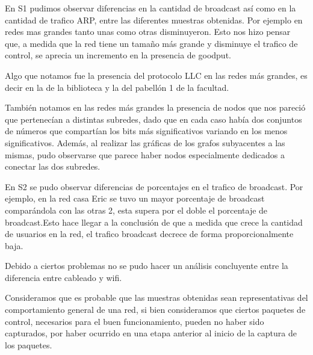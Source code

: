 	En S1 pudimos observar diferencias en la cantidad de broadcast así
    como en la cantidad de trafico ARP, entre las diferentes muestras
    obtenidas. Por ejemplo en redes mas grandes tanto unas como otras
    disminuyeron. Esto nos hizo pensar que, a medida que la red tiene
    un tamaño más grande y disminuye el trafico de control, se aprecia
    un incremento en la presencia de goodput.

    
    Algo que notamos fue la presencia del protocolo LLC en las redes
    más grandes, es decir en la de la biblioteca y la del pabellón 1
    de la facultad.

    También notamos en las redes más grandes la presencia de nodos que
    nos pareció que pertenecían a distintas subredes, dado que en cada
    caso había dos conjuntos de números que compartían los bits más
    significativos variando en los menos significativos. Además, al
    realizar las gráficas de los grafos subyacentes a las mismas,
    pudo observarse que parece haber nodos especialmente dedicados a
    conectar las dos subredes.

    En S2 se pudo observar diferencias de porcentajes en el trafico de
    broadcast. Por ejemplo, en la red casa Eric se tuvo un mayor
    porcentaje de broadcast comparándola con las otras 2, esta supera
    por el doble el porcentaje de broadcast.Esto hace llegar a la
    conclusión de que a medida que crece la cantidad de usuarios en la
    red, el trafico broadcast decrece de forma proporcionalmente baja.


Debido a ciertos problemas no se pudo hacer un análisis concluyente entre la diferencia entre cableado y wifi.

Consideramos que es probable que las muestras obtenidas sean
representativas del comportamiento general de una red, si bien
consideramos que ciertos paquetes de control, necesarios para el buen
funcionamiento, pueden no haber sido capturados, por haber ocurrido en
una etapa anterior al inicio de la captura de los paquetes.



